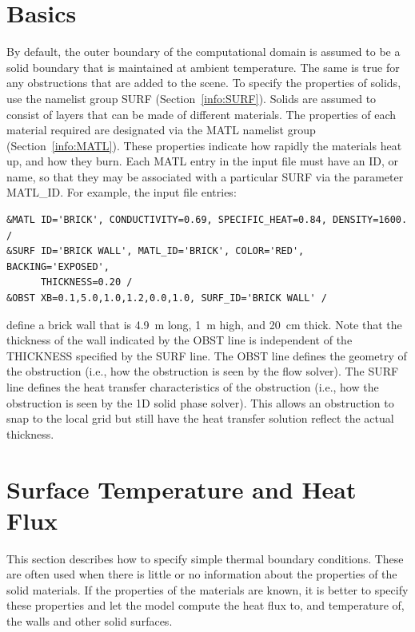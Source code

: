 \documentclass[11pt]{book}
\begin{document}
\section{Basics}
\label{info:SURF_MATL_Basics}

By default, the outer boundary of the computational domain is assumed to be a solid boundary that is maintained at ambient temperature. The same is true for any obstructions that are added to the scene. To specify the properties of solids, use the namelist group {\ct SURF} (Section~\ref{info:SURF}). Solids are assumed to consist of layers that can be made of different materials.  The properties of each material required are designated via the {\ct MATL} namelist group (Section~\ref{info:MATL}).  These properties indicate how rapidly the materials heat up, and how they burn.  Each {\ct MATL} entry in the input file must have an {\ct ID}, or name, so that they may be associated with a particular {\ct SURF} via the parameter {\ct MATL\_ID}.  For example, the input file entries:
\begin{lstlisting}
&MATL ID='BRICK', CONDUCTIVITY=0.69, SPECIFIC_HEAT=0.84, DENSITY=1600. /
&SURF ID='BRICK WALL', MATL_ID='BRICK', COLOR='RED', BACKING='EXPOSED',
      THICKNESS=0.20 /
&OBST XB=0.1,5.0,1.0,1.2,0.0,1.0, SURF_ID='BRICK WALL' /
\end{lstlisting}
define a brick wall that is 4.9~m long, 1~m high, and 20~cm thick. Note that the thickness of the wall indicated by the {\ct OBST} line is independent of the {\ct THICKNESS} specified by the {\ct SURF} line.  The {\ct OBST} line defines the geometry of the obstruction (i.e., how the obstruction is seen by the flow solver).  The {\ct SURF} line defines the heat transfer characteristics of the obstruction (i.e., how the obstruction is seen by the 1D solid phase solver).  This allows an obstruction to snap to the local grid but still have the heat transfer solution reflect the actual thickness.



\section{Surface Temperature and Heat Flux}

This section describes how to specify simple thermal boundary conditions. These are often used when there is little or no
information about the properties of the solid materials. If the properties of the materials are known, it is better to specify these
properties and let the model compute the heat flux to, and temperature of, the walls and other solid surfaces.
\end{document}
